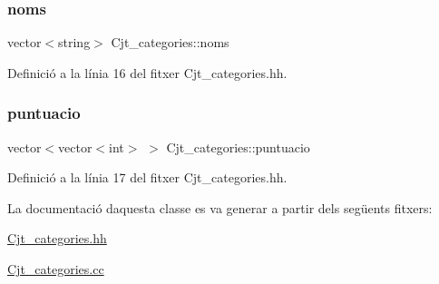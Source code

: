 \mbox{\label{class_cjt__categories_a45622c30fae365dc72f2d7aa5fbc3bfc}} 
\subsubsection{\texorpdfstring{noms}{noms}}
{\footnotesize\ttfamily vector$<$string$>$ Cjt\+\_\+categories\+::noms\hspace{0.3cm}{\ttfamily [private]}}



Definició a la línia 16 del fitxer Cjt\+\_\+categories.\+hh.

\mbox{\label{class_cjt__categories_a121b331af19b7307f320b21f0edd8b30}} 
\subsubsection{\texorpdfstring{puntuacio}{puntuacio}}
{\footnotesize\ttfamily vector$<$vector$<$int$>$ $>$ Cjt\+\_\+categories\+::puntuacio\hspace{0.3cm}{\ttfamily [private]}}



Definició a la línia 17 del fitxer Cjt\+\_\+categories.\+hh.



La documentació d\textquotesingle{}aquesta classe es va generar a partir dels següents fitxers\+:\begin{DoxyCompactItemize}
\item 
\mbox{\hyperlink{_cjt__categories_8hh}{Cjt\+\_\+categories.\+hh}}\item 
\mbox{\hyperlink{_cjt__categories_8cc}{Cjt\+\_\+categories.\+cc}}\end{DoxyCompactItemize}
